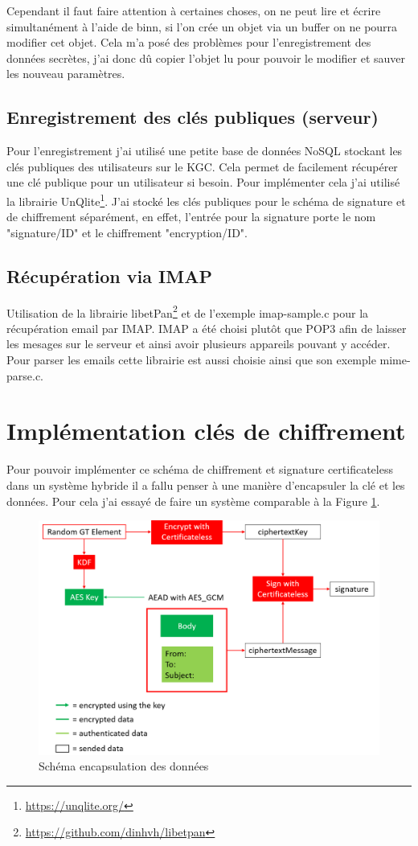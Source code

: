 Cependant il faut faire attention à certaines choses, on ne peut lire et écrire simultanément à l'aide de binn, si l'on crée un objet via un buffer on ne pourra modifier cet objet. Cela m'a posé des problèmes pour l'enregistrement des données secrètes, j'ai donc dû copier l'objet lu pour pouvoir le modifier et sauver les nouveau paramètres.
\subsection{Enregistrement des clés publiques (serveur)}
Pour l'enregistrement j'ai utilisé une petite base de données NoSQL stockant les clés publiques des utilisateurs sur le KGC. Cela permet de facilement récupérer une clé publique pour un utilisateur si besoin. Pour implémenter cela j'ai utilisé la librairie UnQlite\footnote{\url{https://unqlite.org/}}. J'ai stocké les clés publiques pour le schéma de signature et de chiffrement séparément, en effet, l'entrée pour la signature porte le nom "signature/ID" et le chiffrement "encryption/ID".
\subsection{Récupération via IMAP}
Utilisation de la librairie libetPan\footnote{\url{https://github.com/dinhvh/libetpan}} et de l'exemple imap-sample.c pour la récupération email par IMAP. IMAP a été choisi plutôt que POP3 afin de laisser les mesages sur le serveur et ainsi avoir plusieurs appareils pouvant y accéder. Pour parser les emails cette librairie est aussi choisie ainsi que son exemple mime-parse.c.
\section{Implémentation clés  de chiffrement}
Pour pouvoir implémenter ce schéma de chiffrement et signature certificateless dans un système hybride il a fallu penser à une manière d'encapsuler la clé et les données. Pour cela j'ai essayé de faire un système comparable à la Figure \ref{fig:encapsulate}.

\begin{figure}[h!]
	\centering
	\includegraphics[width=\textwidth]{images/schemCles.png}
	\caption{Schéma encapsulation des données}
	\label{fig:encapsulate}
\end{figure}

